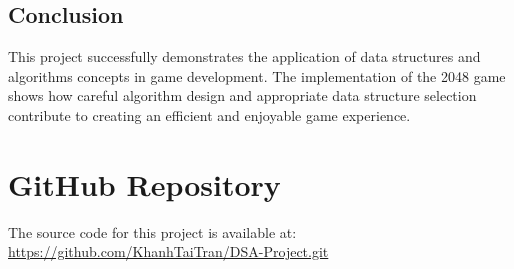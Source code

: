 \documentclass[12pt, a4paper]{article}
\begin{document}
\subsection{Conclusion}
This project successfully demonstrates the application of data structures and algorithms concepts in game development. The implementation of the 2048 game shows how careful algorithm design and appropriate data structure selection contribute to creating an efficient and enjoyable game experience.

\section{GitHub Repository}
The source code for this project is available at: \url{https://github.com/KhanhTaiTran/DSA-Project.git}
\end{document}
